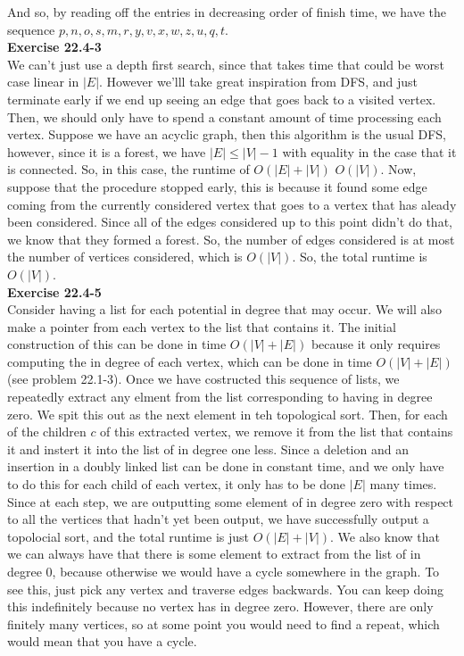 \documentclass{article}
\begin{document}
And so, by reading off the entries in decreasing order of finish time, we have the sequence $p,n,o,s,m,r,y,v,x,w,z,u,q,t$.\\

\noindent\textbf{Exercise 22.4-3}\\
We can't just use a depth first search, since that takes time that could be worst case linear in $|E|$. However we'lll take great inspiration from DFS, and just terminate early if we end up seeing an edge that goes back to a visited vertex. Then, we should only have to spend a constant amount of time processing each vertex. Suppose we have an acyclic graph, then this algorithm is the usual DFS, however, since it is a forest, we have $|E| \le |V|-1$ with equality in the case that it is connected. So, in this case, the runtime of $O(|E|+|V|)$ $O(|V|)$. Now, suppose that the procedure stopped early, this is because it found some edge coming from the currently considered vertex that goes to a vertex that has aleady been considered. Since all of the edges considered up to this point didn't do that, we know that they formed a forest. So, the number of edges considered is at most the number of vertices considered, which is $O(|V|)$. So, the total runtime is $O(|V|)$.\\

\noindent\textbf{Exercise 22.4-5}\\
Consider having a list for each potential in degree that may occur. We will also make a pointer from each vertex to the list that contains it. The initial construction of this can be done in time $O(|V|+|E|)$ because it only requires computing the in degree of each vertex, which can be done in time $O(|V|+|E|)$ (see problem 22.1-3). Once we have costructed this sequence of lists, we repeatedly extract any elment from the list corresponding to having in degree zero. We spit this out as the next element in teh topological sort. Then, for each of the children $c$ of this extracted vertex, we remove it from the list that contains it and instert it into the list of in degree one less. Since a deletion and an insertion in a doubly linked list can be done in constant time, and we only have to do this for each child of each vertex, it only has to be done $|E|$ many times. Since at each step, we are outputting some element of in degree zero with respect to all the vertices that hadn't yet been output, we have successfully output a topolocial sort, and the total runtime is just $O(|E|+|V|)$. We also know that we can always have that there is some element to extract from the list of in degree 0, because otherwise we would have a cycle somewhere in the graph. To see this, just pick any vertex and traverse edges backwards. You can keep doing this indefinitely because no vertex has in degree zero. However, there are only finitely many vertices, so at some point you would need to find a repeat, which would mean that you have a cycle.
\end{document}
